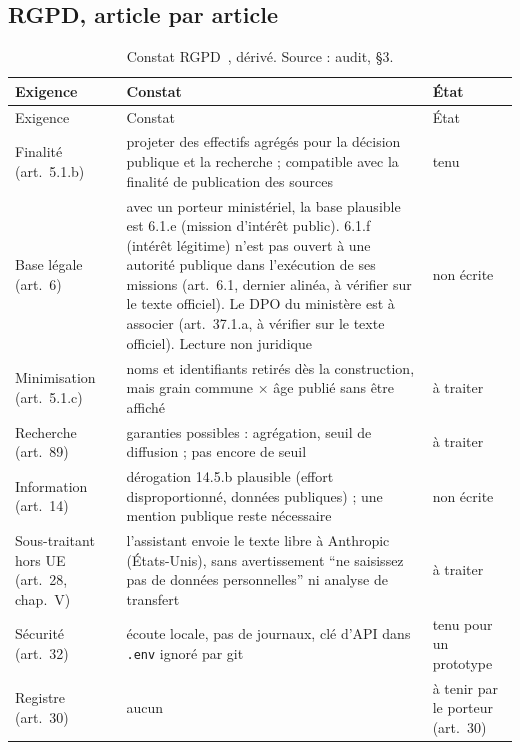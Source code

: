 \subsection{RGPD, article par article}\label{conf:rgpd}

\begin{small}
\begin{longtable}{@{}p{}p{}p{}@{}}
\caption{Constat RGPD~\citep{e-rgpd}, dérivé. Source : audit, §3.}\label{conf:tab-rgpd}\\
\toprule Exigence & Constat & État \\ \midrule\endfirsthead
\toprule Exigence & Constat & État \\ \midrule\endhead
\bottomrule\endfoot
Finalité (art.~5.1.b) & projeter des effectifs agrégés pour la décision publique et la recherche ; compatible avec la finalité de publication des sources & tenu \\
Base légale (art.~6) & avec un porteur ministériel, la base plausible est 6.1.e (mission d'intérêt public). 6.1.f (intérêt légitime) n'est pas ouvert à une autorité publique dans l'exécution de ses missions (art.~6.1, dernier alinéa, à vérifier sur le texte officiel). Le DPO du ministère est à associer (art.~37.1.a, à vérifier sur le texte officiel). Lecture non juridique & non écrite \\
Minimisation (art.~5.1.c) & noms et identifiants retirés dès la construction, mais grain commune $\times$ âge publié sans être affiché & à traiter \\
Recherche (art.~89) & garanties possibles : agrégation, seuil de diffusion ; pas encore de seuil & à traiter \\
Information (art.~14) & dérogation 14.5.b plausible (effort disproportionné, données publiques) ; une mention publique reste nécessaire & non écrite \\
Sous-traitant hors UE (art.~28, chap.~V) & l'assistant envoie le texte libre à Anthropic (États-Unis), sans avertissement \enquote{ne saisissez pas de données personnelles} ni analyse de transfert & à traiter \\
Sécurité (art.~32) & écoute locale, pas de journaux, clé d'API dans \texttt{.env} ignoré par git & tenu pour un prototype \\
Registre (art.~30) & aucun & à tenir par le porteur (art.~30) \\
\end{longtable}
\end{small}


